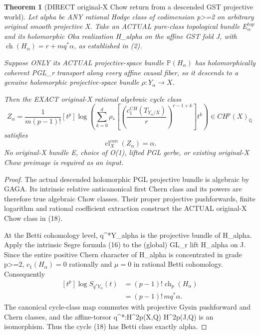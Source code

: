 \documentclass[11pt]{article}
\newtheorem{theorem}{Theorem}
\begin{document}
\begin{theorem}[DIRECT original-X Chow return from a descended GST projective world]
Let alpha be ANY rational Hodge class
of codimension p>=2 on arbitrary
original smooth projective X.
Take an ACTUAL pure-class topological
bundle $E_\alpha^{top}$ and its
holomorphic Oka realization H_alpha
on the affine GST fold J, with
$\operatorname{ch}(H_\alpha)=r+m q^*\alpha$,
as established in (2).

Suppose ONLY its ACTUAL projective-space
bundle $\mathbb P(H_\alpha)$ has
holomorphically coherent PGL_r
transport along every affine causal
fiber, so it descends to a genuine
holomorphic projective-space bundle
$\rho:Y_\alpha\to X$.

Then the EXACT original-X rational
algebraic cycle class
\[
 \boxed{
 Z_\alpha=
   \frac1{m(p-1)!}
    [t^p]\log\!\left(
       \sum_{k=0}^d
         \rho_*\left[
           \left(\frac{c_1^{CH}(T_{Y_\alpha/X})}{r}
           \right)^{r-1+k}
         \right]t^k
       \right)
  \in CH^p(X)_\mathbb Q
 }                                                       \tag{18}
\]
satisfies
\[
 \boxed{\operatorname{cl}^{can}_X(Z_\alpha)=\alpha.}
                                                             \tag{19}
\]
No original-X bundle E, choice of
O(1), lifted PGL gerbe, or existing
original-X Chow preimage is
required as an input.
\end{theorem}
\begin{proof}
The actual descended holomorphic
PGL projective bundle is algebraic
by GAGA. Its intrinsic relative
anticanonical first Chern class and
its powers are therefore true
algebraic Chow classes. Their
proper projective pushforwards,
finite logarithm and rational
coefficient extraction construct
the ACTUAL original-X Chow class
in (18).

At the Betti cohomology level,
q^*Y_alpha is the projective
bundle of H_alpha. Apply the
intrinsic Segre formula (16)
to the (global) GL_r
lift H_alpha on J. Since
the entire positive Chern
character of H_alpha is
concentrated in grade p>=2,
$c_1(H_\alpha)=0$ rationally
and $\mu=0$ in rational Betti
cohomology. Consequently
\[
 \begin{aligned}
 [t^p]\log S_{q^*Y_\alpha}(t)
    &=(p-1)!\operatorname{ch}_p(H_\alpha)\\
    &=(p-1)!\,m q^*\alpha.
 \end{aligned}
\]
The canonical cycle-class map
commutes with projective
Gysin pushforward and Chern
classes, and the affine-torsor
q^*:H^{2p}(X,\mathbb Q)
   \overset{\sim}{\to}H^{2p}(J,\mathbb Q)
is an isomorphism.
Thus the cycle (18) has Betti
class exactly alpha.
\end{proof}
\end{document}
